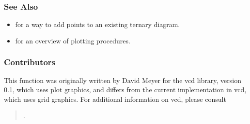 \subsubsection{See Also}
\begin{itemize}
\item {} for a way to add points to an existing
ternary diagram.  
\item {} for an overview of plotting procedures.  
\end{itemize} 

\subsubsection{Contributors}

This function was originally written by David Meyer for the vcd
library, version 0.1, which uses plot graphics, and differs from
the current implementation in vcd, which uses grid graphics.
For additional information on vcd, please consult
\begin{verse}
.
\end{verse}

